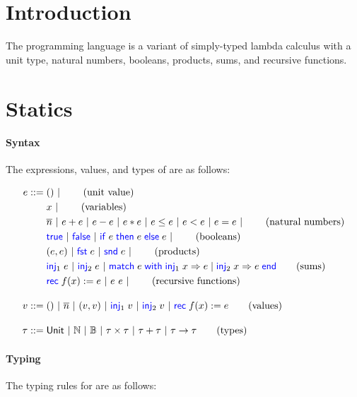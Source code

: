 \documentclass[10pt]{scrartcl}
\begin{document}
\author{Amin Timany}
\title{\simplelang{}}

\maketitle

\section{Introduction}
\label{sec:intro}
The programming language \simplelang{} is a variant of simply-typed lambda calculus with a unit type, natural numbers, booleans, products, sums, and recursive functions.

\section{Statics}
\label{sec:statics}

\paragraph{Syntax}
The expressions, values, and types of \simplelang{} are as follows:

\begin{align*}
  \expr \BNFdef{}
  & \TT \ALT \tag{unit value} \\
  & \var \ALT \tag{variables} \\
  & \Num{n} \ALT \expr + \expr \ALT \expr - \expr \ALT \expr * \expr \ALT \expr \le \expr \ALT \expr < \expr \ALT \expr = \expr \ALT \tag{natural numbers}\\
  & \True \ALT \False \ALT \If \expr then \expr\; \Else \expr \ALT \tag{booleans} \\
  & (\expr, \expr) \ALT \Fst \expr \ALT \Snd \expr \ALT \tag{products} \\
  & \Inj{1} \expr \ALT \Inj{2} \expr \ALT \Match \expr with \Inj{1} \var => \expr | \Inj{2} \var => \expr end \tag{sums}\\
  & \Rec f \var := \expr \ALT \expr~\expr \ALT \tag{recursive functions}\\[1em]
  \val \BNFdef{}
  & \TT \ALT \Num{n} \ALT (\val, \val) \ALT \Inj{1} \val \ALT \Inj{2} \val \ALT \Rec f \var := \expr \tag{values}\\[1em]
  \typ \BNFdef{}
  & \Tunit \ALT \Tnat \ALT \Tbool \ALT \typ \times \typ \ALT \typ + \typ \ALT \typ \to \typ \tag{types}
\end{align*}

\paragraph{Typing}
The typing rules for \simplelang{} are as follows:
\end{document}
